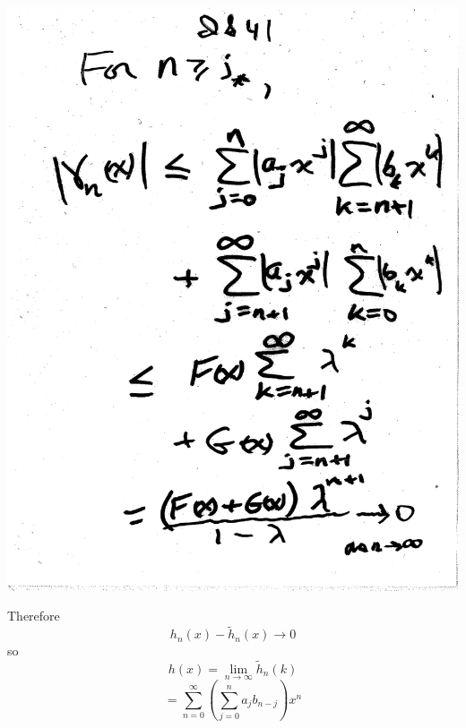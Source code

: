 \documentclass[10pt,a4paper]{article}
\begin{document}
\includegraphics[scale=.5]{Pages/IS_41}

\newpage

Therefore $$ h_n (x) - \tilde{h}_n (x) \rightarrow 0$$
so 
$$h (x) = \lim_{n \rightarrow \infty} \tilde{h}_n (k)$$
$$= \sum_{n=0}^\infty (\sum_{j=0}^n a_jb_{n-j})x^n$$
\end{document}
